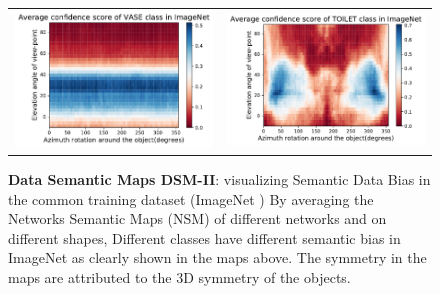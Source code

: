\begin{figure}[]
\begin{tabular}{c|c}
\includegraphics[width = 9cm]{supimages/bias/vase_Average_2D.pdf}&
\includegraphics[width = 9cm]{supimages/bias/toilet_Average_2D.pdf}
\end{tabular}
   \caption{\small \textbf{Data Semantic Maps DSM-II}: visualizing Semantic Data Bias in the common training dataset (\ie ImageNet \cite{IMAGENET}) By averaging the Networks Semantic Maps (NSM) of different networks and on different shapes, Different classes have different semantic bias in ImageNet as clearly shown in the maps above. The symmetry in the maps are attributed to the 3D symmetry of the objects.}
   \vspace{-8pt}
   \label{fig:dsm2}
\end{figure}


\clearpage
